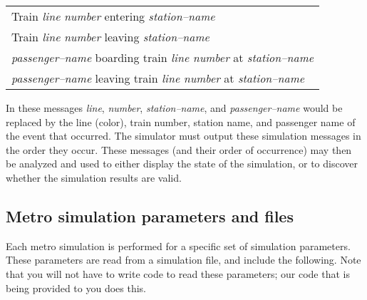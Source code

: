 \documentclass[11pt]{article}
\begin{document}
      \begin{center}

        \renewcommand{\arraystretch}{1.25}

        \begin{tabular}[t]{l}

          Train \emph{line} \emph{number} entering \emph{station--name}
            \\

          Train \emph{line} \emph{number} leaving \emph{station--name}
            \\

          \emph{passenger--name} boarding train \emph{line} \emph{number} at
          \emph{station--name}
            \\

          \emph{passenger--name} leaving train \emph{line} \emph{number} at
          \emph{station--name}
            \\

        \end{tabular}

      \end{center}

      \vspace{-2.5mm}

    \noindent
    In these messages \emph{line}, \emph{number}, \emph{station--name}, and
    \emph{passenger--name} would be replaced by the line (color), train
    number, station name, and passenger name of the event that occurred.
    The simulator must output these simulation messages in the order they
    occur.  These messages (and their order of occurrence) may then be
    analyzed and used to either display the state of the simulation, or to
    discover whether the simulation results are valid.

    \subsection{Metro simulation parameters and files}

      Each metro simulation is performed for a specific set of simulation
    parameters.  These parameters are read from a simulation file, and
    include the following.  Note that you will not have to write code to
    read these parameters; our code that is being provided to you does this.

      \vspace{-2mm}
\end{document}
